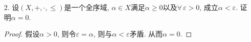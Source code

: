 \begin{3a}
\begin{itemize}
\begin{proof}
(4)先证 \((-1^*)(-1^*)=1^*\):\[\begin{split}
                1^*+(-1^*)=0^*&\Rightarrow (-1^*)*(1^*+(-1)^*)=0^*\Rightarrow -1^*+(-1^*)(-1^*)=0^*\\
                &\Rightarrow (-1^*)(-1^*)=1^*.
            \end{split}\]
若\(\alpha\geqslant 0\), 依乘法的保序性可知\(\alpha^2\geqslant 0\), 
并且若\(\alpha>0\)而\(\alpha^2=0^*\), 
则两侧乘以\(\alpha^{-1}\)得\(\alpha=0^*\), 可得矛盾. 
从而若\(\alpha^2=0^*\)必有\(\alpha= 0^*\).
若\(\alpha <0^*\), 则\(-\alpha>0^*\),从而
\[\alpha\alpha=1^*\cdot \alpha\cdot\alpha
=(-1^*)(-1^*)\alpha\alpha=(-\alpha)(-\alpha)>0^*.\]

(5)设\(\alpha>0,\beta<0\), 则\(-\beta>0\), 从而\(\alpha(-\beta)>0^*\), 
于是\(\alpha\beta<0\).若\(\alpha>0\)而\(1/\alpha<0\), 则
\[\alpha\cdot 1/\alpha=1^*<0^*,\]矛盾.

(6)由于\(\alpha>0,\beta-\gamma>0\), 从而\(\alpha(\beta-\gamma)>0\). 可得\(\alpha\beta>\alpha\gamma.\)
\end{proof}
\item[2.] 设\((X,+,\cdot,\leqslant)\)是一个全序域, 
\(\alpha\in X\)满足\(\alpha\geqslant 0\)以及\(\forall\, \varepsilon>0\), 
成立\(\alpha<\varepsilon\). 证明\(\alpha=0.\)
\begin{proof}
假设\(\alpha>0\), 则令\(\varepsilon=\alpha\), 则与\(\alpha<\varepsilon\)矛盾. 从而\(\alpha=0\).
\end{proof}
\end{itemize}
\end{3a}

